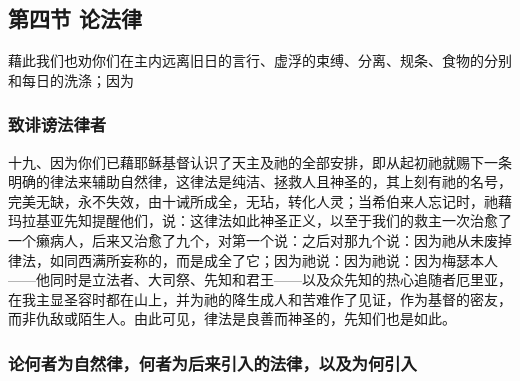 \subsection{第四节 论法律}

藉此我们也劝你们在主内远离旧日的言行、虚浮的束缚、分离、规条、食物的分别和每日的洗涤；因为\par


\subsubsection{致诽谤法律者}

十九、因为你们已藉耶稣基督认识了天主及祂的全部安排，即从起初祂就赐下一条明确的律法来辅助自然律，这律法是纯洁、拯救人且神圣的，其上刻有祂的名号，完美无缺，永不失效，由十诫所成全，无玷，转化人灵；当希伯来人忘记时，祂藉玛拉基亚先知提醒他们，说：这律法如此神圣正义，以至于我们的救主一次治愈了一个癞病人，后来又治愈了九个，对第一个说：之后对那九个说：因为祂从未废掉律法，如同西满所妄称的，而是成全了它；因为祂说：因为祂说：因为梅瑟本人——他同时是立法者、大司祭、先知和君王——以及众先知的热心追随者厄里亚，在我主显圣容时都在山上，并为祂的降生成人和苦难作了见证，作为基督的密友，而非仇敌或陌生人。由此可见，律法是良善而神圣的，先知们也是如此。\par


\subsubsection{论何者为自然律，何者为后来引入的法律，以及为何引入}

